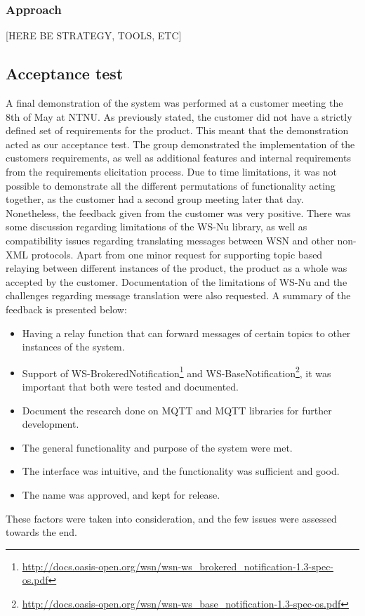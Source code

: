 \subsubsection{Approach}

[HERE BE STRATEGY, TOOLS, ETC]

\subsection{Acceptance test}
\label{subsec:testing-test_execution-acceptance_test}

A final demonstration of the system was performed at a customer meeting the 8th of May at NTNU. As previously stated, the customer did not have a strictly defined set of requirements for the product. This meant that the demonstration acted as our acceptance test. The group demonstrated the implementation of the customers requirements, as well as additional features and internal requirements from the requirements elicitation process. Due to time limitations, it was not possible to demonstrate all the different permutations of functionality acting together, as the customer had a second group meeting later that day. Nonetheless, the feedback given from the customer was very positive. There was some discussion regarding limitations of the WS-Nu library, as well as compatibility issues regarding translating messages between WSN and other non-XML protocols. Apart from one minor request for supporting topic based relaying between different instances of the product, the product as a whole was accepted by the customer. Documentation of the limitations of WS-Nu and the challenges regarding message translation were also requested. A summary of the feedback is presented below:

\begin{itemize}
\item Having a relay function that can forward messages of certain topics to other instances of the system.
\item Support of WS-BrokeredNotification\footnote{\url{http://docs.oasis-open.org/wsn/wsn-ws_brokered_notification-1.3-spec-os.pdf}} and WS-BaseNotification\footnote{\url{http://docs.oasis-open.org/wsn/wsn-ws_base_notification-1.3-spec-os.pdf}}, it was important that both were tested and documented.
\item Document the research done on MQTT and MQTT libraries for further development.
\item The general functionality and purpose of the system were met.
\item The interface was intuitive, and the functionality was sufficient and good.
\item The name was approved, and kept for release.
\end{itemize}

These factors were taken into consideration, and the few issues were assessed towards the end.

\clearpage